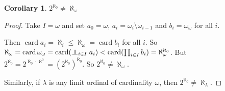 \documentclass[a4paper]{article}
\theoremstyle{definition}
\newtheorem*{cor}{Corollary}
\newcommand{\oadd}{\mathrel\bot\joinrel\mspace{-8mu}\mathrel\bot}
\DeclareMathOperator\card{card}
\begin{document}
\begin{cor}
  $2^{\aleph_0}\not= \aleph_\omega$
\end{cor}

\begin{proof}
  Take $I = \omega$ and set $a_0 = \omega$, $a_i = \omega_i\setminus \omega_{i - 1}$ and $b_i = \omega_\omega$ for all $i$.

  Then $\card a_i = \aleph_i \leq \aleph_\omega = \card b_i$ for all $i$. So $\aleph_\omega = \card \omega_\omega = \card (\oadd_{i\in I}a_i) < \card(\prod_{i\in I}b_i) = \aleph_\omega^{\aleph_0}$. But $2^{\aleph_0} = 2^{\aleph_0\cdot \aleph^0} = (2^{\aleph_0})^{\aleph_0}$. So $2^{\aleph_0} \not= \aleph_\omega$.

Similarly, if $\lambda$ is any limit ordinal of cardinality $\omega$, then $2^{\aleph_0} \not= \aleph_{\lambda}$.
\end{proof}
\end{document}
